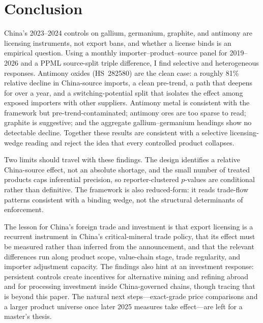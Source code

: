 \documentclass[12pt,a4paper]{article}
\begin{document}
\section{Conclusion}\label{sec:conclusion}

China's 2023--2024 controls on gallium, germanium, graphite, and antimony are
licensing instruments, not export bans, and whether a license binds is an
empirical question. Using a monthly importer--product--source panel for
2019--2026 and a PPML source-split triple difference, I find selective and
heterogeneous responses. Antimony oxides (HS~282580) are the clean case: a
roughly 81\% relative decline in China-source imports, a clean pre-trend, a path
that deepens for over a year, and a switching-potential split that isolates the
effect among exposed importers with other suppliers. Antimony metal is
consistent with the framework but pre-trend-contaminated; antimony ores are too
sparse to read; graphite is suggestive; and the aggregate gallium--germanium
headings show no detectable decline. Together these results are consistent with
a selective licensing-wedge reading and reject the idea that every controlled
product collapses.

Two limits should travel with these findings. The design identifies a relative
China-source effect, not an absolute shortage, and the small number of treated
products caps inferential precision, so reporter-clustered $p$-values are
conditional rather than definitive. The framework is also reduced-form: it reads
trade-flow patterns consistent with a binding wedge, not the structural
determinants of enforcement.

The lesson for China's foreign trade and investment is that export licensing is
a recurrent instrument in China's critical-mineral trade policy, that its effect must be measured rather than
inferred from the announcement, and that the relevant differences run along
product scope, value-chain stage, trade regularity, and importer adjustment
capacity. The findings also hint at an investment response: persistent controls
create incentives for alternative mining and refining abroad and for processing
investment inside China-governed chains, though tracing that is beyond this
paper. The natural next steps---exact-grade price comparisons and a larger
product universe once later 2025 measures take effect---are left for a master's
thesis.

\renewcommand{\refname}{References}


\end{document}
